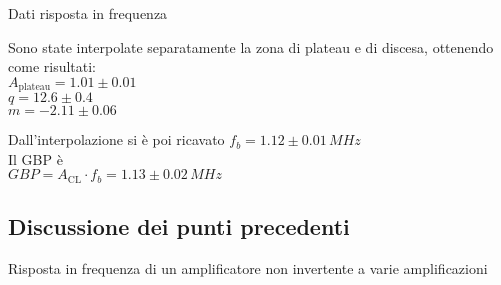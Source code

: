 \begin{tabella}
 \centering
  
 \caption{Dati risposta in frequenza}
 \label{tab:tab_noninv_A1.tex}
\end{tabella}

Sono state interpolate separatamente la zona di plateau e di discesa, ottenendo come risultati:\\
$A_\textrm{plateau}=1.01 \pm 0.01$\\
$q = 12.6 \pm 0.4$\\
$m  = -2.11 \pm 0.06$

Dall'interpolazione si è poi ricavato 
$f_b=1.12\pm 0.01 \,MHz $\\
Il GBP è\\
$GBP=A_\textrm{CL} \cdot f_b  = 1.13 \pm 0.02 \,MHz$

\subsection{Discussione dei punti precedenti}

\begin{grafico}
 \centering 
  \resizebox{\textwidth}{!}{%
  
 }%
 \caption{Risposta in frequenza di un amplificatore non invertente a varie amplificazioni} 
 \label{gr:amp_noninv_all.tex} 
\end{grafico}


